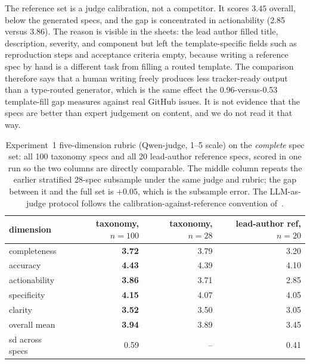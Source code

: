 \documentclass[preprint,12pt]{elsarticle}
\begin{document}
The reference set is a judge calibration, not a competitor. It scores $3.45$ overall, below the
generated specs, and the gap is concentrated in actionability (2.85 versus 3.86). The reason is
visible in the sheets: the lead author filled title, description, severity, and component but
left the template-specific fields such as reproduction steps and acceptance criteria empty,
because writing a reference spec by hand is a different task from filling a routed template. The
comparison therefore says that a human writing freely produces less tracker-ready output than a
type-routed generator, which is the same effect the 0.96-versus-0.53 template-fill gap measures
against real GitHub issues. It is not evidence that the specs are better than expert judgement
on content, and we do not read it that way.

\begin{table}[!htbp]\centering\footnotesize
\caption{Experiment~1 five-dimension rubric (Qwen-judge, 1--5 scale) on the \emph{complete}
spec set: all 100 taxonomy specs and all 20 lead-author reference specs, scored in one run so
the two columns are directly comparable. The middle column repeats the earlier stratified
28-spec subsample under the same judge and rubric; the gap between it and the full set is
$+0.05$, which is the subsample error. The LLM-as-judge protocol follows the
calibration-against-reference convention of~\cite{gilardi2023chatgpt, pangakis2023automated,
zheng2023judging}.}\label{tab:rubric}
\begin{tabular}{lrrr}\toprule
dimension & taxonomy, $n=100$ & taxonomy, $n=28$ & lead-author ref, $n=20$ \\\midrule
completeness & \textbf{3.72} & 3.79 & 3.20 \\
accuracy & \textbf{4.43} & 4.39 & 4.10 \\
actionability & \textbf{3.86} & 3.71 & 2.85 \\
specificity & \textbf{4.15} & 4.07 & 4.05 \\
clarity & \textbf{3.52} & 3.50 & 3.05 \\\midrule
overall mean & \textbf{3.94} & 3.89 & 3.45 \\
sd across specs & 0.59 & -- & 0.41 \\
\bottomrule\end{tabular}\end{table}
\end{document}
